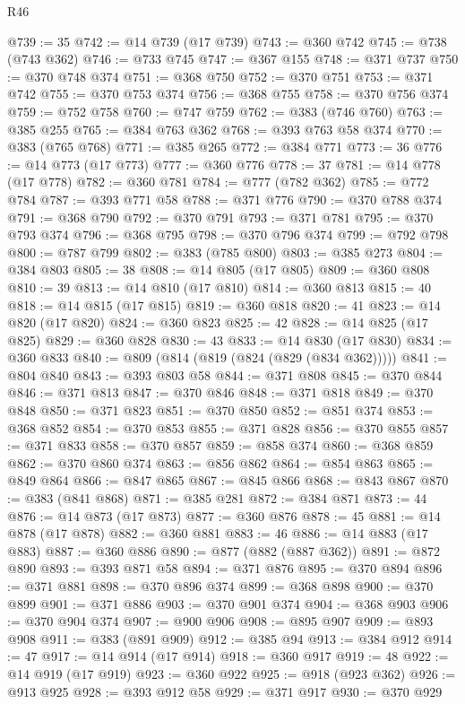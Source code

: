 \begin{lexlean}{R46}
\begin{coremodule}
@739 := 35
@742 := @14 @739 (@17 @739)
@743 := @360 @742
@745 := @738 (@743 @362)
@746 := @733 @745
@747 := @367 @155
@748 := @371 @737
@750 := @370 @748 @374
@751 := @368 @750
@752 := @370 @751
@753 := @371 @742
@755 := @370 @753 @374
@756 := @368 @755
@758 := @370 @756 @374
@759 := @752 @758
@760 := @747 @759
@762 := @383 (@746 @760)
@763 := @385 @255
@765 := @384 @763 @362
@768 := @393 @763 @58 @374
@770 := @383 (@765 @768)
@771 := @385 @265
@772 := @384 @771
@773 := 36
@776 := @14 @773 (@17 @773)
@777 := @360 @776
@778 := 37
@781 := @14 @778 (@17 @778)
@782 := @360 @781
@784 := @777 (@782 @362)
@785 := @772 @784
@787 := @393 @771 @58
@788 := @371 @776
@790 := @370 @788 @374
@791 := @368 @790
@792 := @370 @791
@793 := @371 @781
@795 := @370 @793 @374
@796 := @368 @795
@798 := @370 @796 @374
@799 := @792 @798
@800 := @787 @799
@802 := @383 (@785 @800)
@803 := @385 @273
@804 := @384 @803
@805 := 38
@808 := @14 @805 (@17 @805)
@809 := @360 @808
@810 := 39
@813 := @14 @810 (@17 @810)
@814 := @360 @813
@815 := 40
@818 := @14 @815 (@17 @815)
@819 := @360 @818
@820 := 41
@823 := @14 @820 (@17 @820)
@824 := @360 @823
@825 := 42
@828 := @14 @825 (@17 @825)
@829 := @360 @828
@830 := 43
@833 := @14 @830 (@17 @830)
@834 := @360 @833
@840 := @809 (@814 (@819 (@824 (@829 (@834 @362)))))
@841 := @804 @840
@843 := @393 @803 @58
@844 := @371 @808
@845 := @370 @844
@846 := @371 @813
@847 := @370 @846
@848 := @371 @818
@849 := @370 @848
@850 := @371 @823
@851 := @370 @850
@852 := @851 @374
@853 := @368 @852
@854 := @370 @853
@855 := @371 @828
@856 := @370 @855
@857 := @371 @833
@858 := @370 @857
@859 := @858 @374
@860 := @368 @859
@862 := @370 @860 @374
@863 := @856 @862
@864 := @854 @863
@865 := @849 @864
@866 := @847 @865
@867 := @845 @866
@868 := @843 @867
@870 := @383 (@841 @868)
@871 := @385 @281
@872 := @384 @871
@873 := 44
@876 := @14 @873 (@17 @873)
@877 := @360 @876
@878 := 45
@881 := @14 @878 (@17 @878)
@882 := @360 @881
@883 := 46
@886 := @14 @883 (@17 @883)
@887 := @360 @886
@890 := @877 (@882 (@887 @362))
@891 := @872 @890
@893 := @393 @871 @58
@894 := @371 @876
@895 := @370 @894
@896 := @371 @881
@898 := @370 @896 @374
@899 := @368 @898
@900 := @370 @899
@901 := @371 @886
@903 := @370 @901 @374
@904 := @368 @903
@906 := @370 @904 @374
@907 := @900 @906
@908 := @895 @907
@909 := @893 @908
@911 := @383 (@891 @909)
@912 := @385 @94
@913 := @384 @912
@914 := 47
@917 := @14 @914 (@17 @914)
@918 := @360 @917
@919 := 48
@922 := @14 @919 (@17 @919)
@923 := @360 @922
@925 := @918 (@923 @362)
@926 := @913 @925
@928 := @393 @912 @58
@929 := @371 @917
@930 := @370 @929

\end{coremodule}
\end{lexlean}
